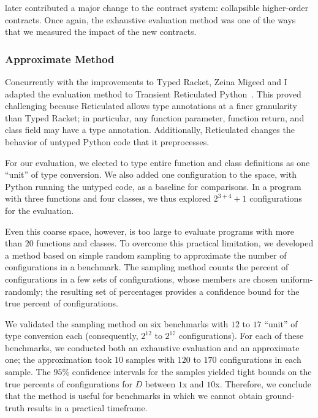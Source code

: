 \citet{fgsfs-oopsla-2018} later contributed a major change to the contract system:
 collapsible higher-order contracts.
Once again, the exhaustive evaluation method was one of the ways that we
 measured the impact of the new contracts.


\subsubsection{Approximate Method}

Concurrently with the improvements to Typed Racket, Zeina Migeed and I
 adapted the evaluation method to Transient Reticulated Python~\cite{gm-pepm-2018}.
This proved challenging because Reticulated allows type annotations
 at a finer granularity than Typed Racket; in particular, any function
 parameter, function return, and class field may have a type annotation.
Additionally, Reticulated changes the behavior of untyped Python code that
 it preprocesses.

For our evaluation, we elected to type entire function and class definitions
 as one ``unit'' of type conversion.
We also added one configuration to the space, with Python running the untyped
 code, as a baseline for comparisons.
In a program with three functions and four classes, we thus explored
 $2^{3+4} + 1$ configurations for the evaluation.

Even this coarse space, however, is too large to evaluate programs with more
 than $20$ functions and classes.
To overcome this practical limitation, we developed a method based on
 simple random sampling to approximate the number of 
 configurations in a benchmark.
The sampling method counts the percent of  configurations
 in a few sets of configurations, whose members are chosen uniform-randomly;
 the resulting set of percentages provides a confidence bound for the true
 percent of  configurations.

We validated the sampling method on six benchmarks with $12$ to $17$ ``unit''
 of type conversion each (consequently, $2^{12}$ to $2^{17}$ configurations).
For each of these benchmarks, we conducted both an exhaustive evaluation and
 an approximate one; the approximation took $10$ samples with $120$ to $170$
 configurations in each sample.
The $95$\% confidence intervals for the samples yielded tight bounds on the
 true percents of  configurations for $D$ between $1$x and
 $10$x.
Therefore, we conclude that the method is useful for benchmarks in which we
 cannot obtain ground-truth results in a practical timeframe.


